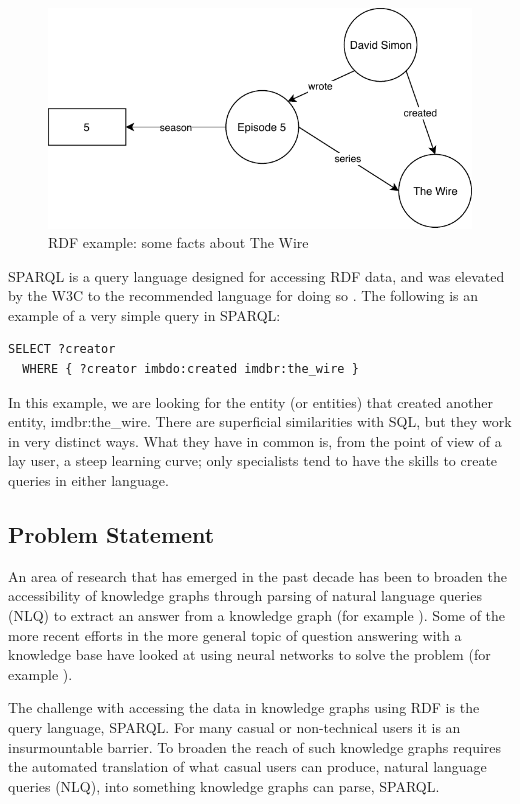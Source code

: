 \documentclass[12pt]{article}
\begin{document}
\begin{figure}
  \centering
  \includegraphics{images/rdf-the-wire.pdf}
  \caption{RDF example: some facts about The Wire}
\end{figure}

SPARQL is a query language designed for accessing RDF data, and was
elevated by the W3C to the recommended language for doing so
\cite{w3cSPARQL}. The following is an example of a very simple query in
SPARQL:

\begin{lstlisting}[language=SPARQL]
  SELECT ?creator
  WHERE { ?creator imbdo:created imdbr:the_wire }
\end{lstlisting}

In this example, we are looking for the entity (or entities) that
created another entity, imdbr:the\_wire. There are superficial
similarities with SQL, but they work in very distinct ways. What they
have in common is, from the point of view of a lay user, a steep
learning curve; only specialists tend to have the skills to create
queries in either language.

\subsection{Problem Statement}\label{problem-statement}
An area of research that has emerged in the past decade has been to
broaden the accessibility of knowledge graphs through parsing of natural
language queries (NLQ) to extract an answer from a knowledge graph (for
example \cite{Yahya:2012:NLQ:2390948.2390995}). Some of the more recent
efforts in the more general topic of question answering with a knowledge
base have looked at using neural networks to solve the problem (for
example \cite{liang2016neural}).

The challenge with accessing the data in knowledge graphs using RDF is
the query language, SPARQL. For many casual or non-technical users it is
an insurmountable barrier. To broaden the reach of such knowledge graphs
requires the automated translation of what casual users can produce,
natural language queries (NLQ), into something knowledge graphs can
parse, SPARQL.
\end{document}
